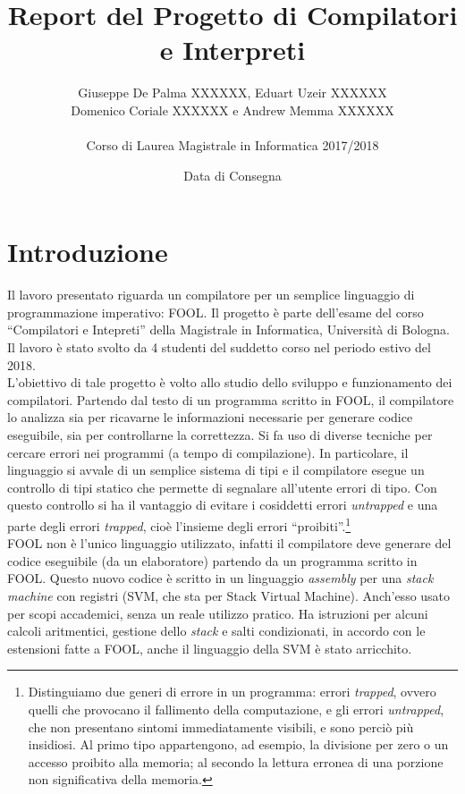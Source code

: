 \documentclass{scrreprt}
\title{Report del Progetto di Compilatori e Interpreti}
\date{Data di Consegna}
\author{Giuseppe De Palma XXXXXX, Eduart Uzeir XXXXXX\\ Domenico Coriale XXXXXX e Andrew Memma XXXXXX\\
\\Corso di Laurea Magistrale in Informatica 2017/2018}
\begin{document}
\maketitle

\tableofcontents

\chapter{Introduzione}
Il lavoro presentato riguarda un compilatore per un semplice linguaggio di programmazione imperativo: FOOL. Il progetto è parte dell'esame del corso ``Compilatori e Intepreti'' della Magistrale in Informatica, Università di Bologna. Il lavoro è stato svolto da 4 studenti del suddetto corso nel periodo estivo del 2018.\\

L'obiettivo di tale progetto è volto allo studio dello sviluppo e funzionamento dei compilatori. Partendo dal testo di un programma scritto in FOOL, il compilatore lo analizza sia per ricavarne le informazioni necessarie per generare codice eseguibile, sia per controllarne la correttezza. Si fa uso di diverse tecniche per cercare errori nei programmi (a tempo di compilazione). In particolare, il linguaggio si avvale di un semplice sistema di tipi e il compilatore esegue un controllo di tipi statico che permette di segnalare all'utente errori di tipo. Con questo controllo si ha il vantaggio di evitare i cosiddetti errori \textit{untrapped} e una parte degli errori \textit{trapped}, cioè l'insieme degli errori ``proibiti''.\footnote{Distinguiamo due generi di errore in un programma: errori \textit{trapped}, ovvero quelli che provocano il fallimento della computazione, e gli errori	\textit{untrapped}, che non	presentano sintomi immediatamente visibili, e sono perciò più insidiosi. Al primo tipo appartengono, ad esempio, la divisione per zero o un accesso proibito alla memoria; al secondo la lettura erronea di una porzione non significativa della memoria.}\\

FOOL non è l'unico linguaggio utilizzato, infatti il compilatore deve generare del codice eseguibile (da un elaboratore) partendo da un programma scritto in FOOL. Questo nuovo codice è scritto in un linguaggio \textit{assembly} per una \textit{stack machine} con registri (SVM, che sta per Stack Virtual Machine). Anch'esso usato per scopi accademici, senza un reale utilizzo pratico. Ha istruzioni per alcuni calcoli aritmentici, gestione dello \textit{stack} e salti condizionati, in accordo con le estensioni fatte a FOOL, anche il linguaggio della SVM è stato arricchito.
\end{document}
